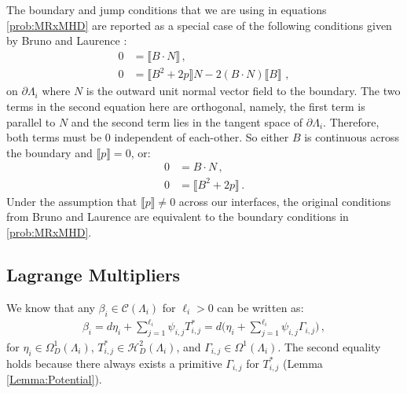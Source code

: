 \documentclass[11pt]{article}
\theoremstyle{plain}
\theoremstyle{definition}
\theoremstyle{remark}
\newcommand{\ST}{\Lambda}
\newcommand{\C}{\mathcal{C} (\ST_i)}
\begin{document}
The boundary and jump conditions that we are using in equations \eqref{prob:MRxMHD} are reported as a special case of the following conditions given by Bruno and Laurence \cite{bruno_laurence_1996}:
\begin{align*}
    0 & = \llbracket B \cdot N \rrbracket \, ,  \\
    0 & = \llbracket B^2 + 2p \rrbracket N - 2 (B \cdot N) \llbracket B \rrbracket \, \, ,
\end{align*}
on \(\partial \ST_i\) where \(N\) is the outward unit normal vector field to the boundary. The two terms in the second equation here are orthogonal, namely, the first term is parallel to \(N\) and the second term lies in the tangent space of \(\partial \ST_i\). Therefore, both terms must be \(0\) independent of each-other. So either \(B\) is continuous across the boundary and \(\llbracket p \rrbracket = 0\), or:
\begin{align*}
    0 & = B \cdot N \, ,  \\
    0 & = \llbracket B^2 + 2p \rrbracket \, .
\end{align*}
Under the assumption that \(\llbracket p \rrbracket \neq 0\) across our interfaces, the original conditions from Bruno and Laurence are equivalent to the boundary conditions in \eqref{prob:MRxMHD}. 



\subsection{Lagrange Multipliers} \label{sub:LM}



We know that any \(\beta_i \in \C\) for \(\ell_i>0\) can be written as:
\begin{align} \label{eq:b_form}
    \beta_i = d \eta_i + \sum_{j=1}^{\ell_i}  \psi_{i,j}  T_{i,j}^*  
    = d \Bigg( \eta_i + \sum_{j=1}^{\ell_i}  \psi_{i,j} \Gamma_{i,j}  \Bigg)\, ,
\end{align}
for \(\eta_i \in  \Omega_D^1(\ST_i)\), \( T_{i,j}^*  \in \mathcal{H}_D^2 (\ST_i) \), and \(\Gamma_{i,j} \in  \Omega^1 (\ST_i)\). The second equality holds because there always exists a primitive \(\Gamma_{i,j}\) for \( T_{i,j}^* \) (Lemma \ref{Lemma:Potential}). 
\end{document}
